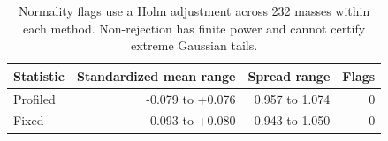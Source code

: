 \begin{table}[H]\centering\small
\begin{tabular}{lrrr}\toprule
Statistic & Standardized mean range & Spread range & Flags\\\midrule
Profiled & -0.079 to +0.076 & 0.957 to 1.074 & 0 \\
Fixed & -0.093 to +0.080 & 0.943 to 1.050 & 0 \\
\bottomrule\end{tabular}
\caption{Normality flags use a Holm adjustment across 232 masses within each method. Non-rejection has finite power and cannot certify extreme Gaussian tails.}\end{table}

